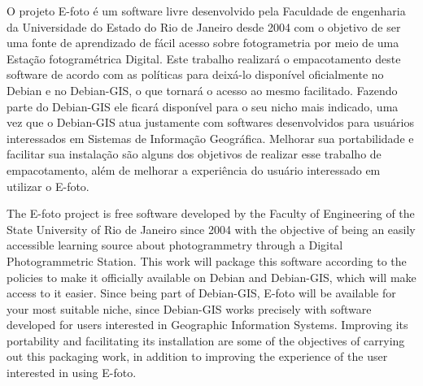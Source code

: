 \documentclass[a4paper,12pt,oneside,onecolumn,final,fleqn]{repUERJ}
\begin{document}
	O projeto E-foto é um software livre desenvolvido pela Faculdade de engenharia da Universidade do Estado do Rio de Janeiro desde 2004 com o objetivo de ser uma fonte de aprendizado de fácil acesso sobre fotogrametria por meio de uma Estação fotogramétrica Digital. Este trabalho realizará o empacotamento deste software de acordo com as políticas para deixá-lo disponível oficialmente no Debian e no Debian-GIS, o que tornará o acesso ao mesmo facilitado. Fazendo parte do Debian-GIS ele ficará disponível para o seu nicho mais indicado, uma vez que o Debian-GIS atua justamente com softwares desenvolvidos para usuários interessados em Sistemas de Informação Geográfica. Melhorar sua portabilidade e facilitar sua instalação são alguns dos objetivos de realizar esse trabalho de empacotamento, além de melhorar a experiência do usuário interessado em utilizar o E-foto.
	~\\
	
	\imprimirchaves %
	
	The E-foto project is free software developed by the Faculty of Engineering of the State University of Rio de Janeiro since 2004 with the objective of being an easily accessible learning source about photogrammetry through a Digital Photogrammetric Station. This work will package this software according to the policies to make it officially available on Debian and Debian-GIS, which will make access to it easier. Since being part of Debian-GIS, E-foto will be available for your most suitable niche, since Debian-GIS works precisely with software developed for users interested in Geographic Information Systems. Improving its portability and facilitating its installation are some of the objectives of carrying out this packaging work, in addition to improving the experience of the user interested in using E-foto.
	~\\
	
	\printkeys %
	\listadefiguras
	\sumario
	\mainmatter %
	
\end{document}
